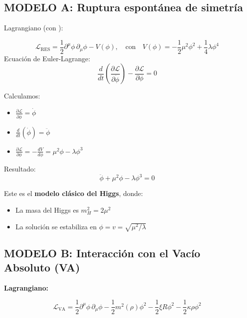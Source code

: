 \documentclass[twoside]{article}
\theoremstyle{definition}
\theoremstyle{remark}
\numberwithin{equation}{section}
\theoremstyle{definition}
\theoremstyle{example}
\theoremstyle{remark}
\numberwithin{equation}{section}%
\begin{document}
		
		\subsection{MODELO A: Ruptura espontánea de simetría}
		
		Lagrangiano (con ):
		
		\begin{equation}\label{e2}
			\mathcal{L}_{\text{RES}} = \frac{1}{2} \partial^\mu \phi \, \partial_\mu \phi - V(\phi), \quad \text{con} \quad V(\phi) = -\frac{1}{2} \mu^2 \phi^2 + \frac{1}{4} \lambda \phi^4
		\end{equation} 
		Ecuación de Euler-Lagrange:
		\begin{equation}\label{e3}
			\frac{d}{dt} \left( \frac{\partial \mathcal{L}}{\partial \dot{\phi}} \right) - \frac{\partial \mathcal{L}}{\partial \phi} = 0
		\end{equation} 
		
		Calculamos:
		\begin{itemize}
			\item $\displaystyle \frac{\partial \mathcal{L}}{\partial \dot{\phi}} = \dot{\phi}$
			\item $\displaystyle \frac{d}{dt} \left( \dot{\phi} \right) = \ddot{\phi}$
			\item $\displaystyle \frac{\partial \mathcal{L}}{\partial \phi} = -\frac{dV}{d\phi} = \mu^2 \phi - \lambda \phi^3$
		\end{itemize}
		Resultado:
		\begin{equation}\label{e5}
			\boxed{ \ddot{\phi} + \mu^2 \phi - \lambda \phi^3 = 0 }
		\end{equation}
		
		
		Este es el \textbf{modelo clásico del Higgs}, donde:	
		\begin{itemize}	
			\item La masa del Higgs es $ m_H^2 = 2\mu^2 $
			\item La solución se estabiliza en $ \phi = v = \sqrt{\mu^2/\lambda} $
		\end{itemize}	       	
		
		\subsection{MODELO B: Interacción con el Vacío Absoluto (VA)}
		
		\textbf{Lagrangiano:}
		
		\begin{equation}
			\mathcal{L}_{\text{VA}} = \frac{1}{2} \partial^\mu \phi \, \partial_\mu \phi - \frac{1}{2} m^2(\rho) \phi^2 - \frac{1}{2} \xi R \phi^2 - \frac{1}{2} \kappa \rho \phi^2
		\end{equation}
		
\end{document}
